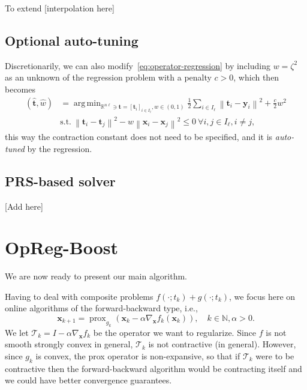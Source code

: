 \documentclass{article}
\DeclareMathOperator*{\argmin}{arg\,min}
\DeclareMathOperator{\prox}{prox}
\newcommand{\norm}[1]{\left\lVert#1\right\rVert}
\newcommand{\N}{\mathbb{N}}
\newcommand{\R}{\mathbb{R}}
\newcommand{\tv}{\mathbold{t}}
\newcommand{\x}{\mathbold{x}}
\newcommand{\y}{\mathbold{y}}
\newcommand{\T}{\mathcal{T}}
\begin{document}
To extend [interpolation here]


\subsection{Optional auto-tuning }

Discretionarily, we can also modify~\eqref{eq:operator-regression} by including $w = \zeta^2$ as an unknown of the regression problem with a penalty $c>0$, which then becomes
\begin{equation}
\begin{split}
	(\hat{\tv}, \hat{w}) &= \argmin_{ \R^{n\ell} \ni \tv = [\tv_i]_{i \in I_{\ell}}, w \in (0,1)} \frac{1}{2} \sum_{i \in I_{\ell}} \norm{\tv_i - \y_i}^2 + \frac{c}{2} w^2 \\
	&\text{s.t.} \ \norm{\tv_i - \tv_j}^2 - w \norm{\x_i - \x_j}^2 \leq 0 \ \forall i,j \in I_{\ell}, i \neq j,
\end{split}
\end{equation}
this way the contraction constant does not need to be specified, and it is \emph{auto-tuned} by the regression.

\subsection{PRS-based solver}

[Add here]

\section{OpReg-Boost}\label{sec:online-opreg}

We are now ready to present our main algorithm. 

Having to deal with composite problems $f(\cdot; t_k) + g(\cdot; t_k)$, we focus here on online algorithms of the forward-backward type, i.e., 
\begin{equation}
\x_{k+1} = \prox_{g_k} (\x_k - \alpha \nabla_{\x} f_k(\x_k)), \quad k \in \N, \alpha >0.
\end{equation}
We let $\T_k = I - \alpha \nabla_{\x} f_k$ be the operator we want to regularize. Since $f$ is not smooth strongly convex in general, $\T_k$ is not contractive (in general). However, since $g_k$ is convex, the prox operator is non-expansive, so that if $\T_k$ were to be contractive then the forward-backward algorithm would be contracting itself and we could have better convergence guarantees. 
\end{document}

